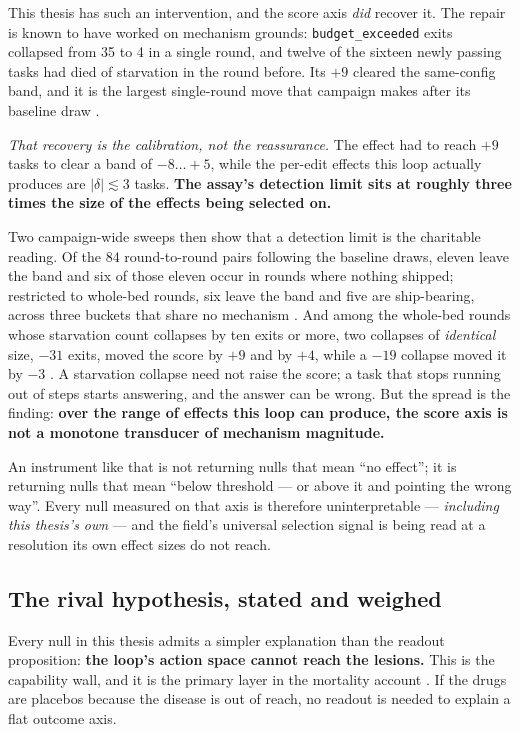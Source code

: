 This thesis has such an intervention, and the score axis \emph{did} recover
it. The repair is known to have worked on mechanism grounds:
\texttt{budget\_exceeded} exits collapsed from 35 to 4 in a single round,
and twelve of the sixteen newly passing tasks had died of starvation in the
round before. Its $+9$ cleared the same-config band, and it is the largest
single-round move that campaign makes after its baseline draw .

\emph{That recovery is the calibration, not the reassurance.} The effect
had to reach $+9$ tasks to clear a band of $-8\ldots{+}5$, while the
per-edit effects this loop actually produces are $|\delta| \lesssim 3$
tasks. \textbf{The assay's detection limit sits at roughly three times the
size of the effects being selected on.}

Two campaign-wide sweeps then show that a detection limit is the charitable
reading. Of the $84$ round-to-round pairs following the baseline draws,
eleven leave the band and six of those eleven occur in rounds where nothing
shipped; restricted to whole-bed rounds, six leave the band and five are
ship-bearing, across three buckets that share no mechanism . And
among the whole-bed rounds whose starvation count collapses by ten exits or
more, two collapses of \emph{identical} size, $-31$ exits, moved the score
by $+9$ and by $+4$, while a $-19$ collapse moved it by $-3$ . A
starvation collapse need not raise the score; a task that stops running out
of steps starts answering, and the answer can be wrong. But the spread is
the finding: \textbf{over the range of effects this loop can produce, the
score axis is not a monotone transducer of mechanism magnitude.}

An instrument like that is not returning nulls that mean ``no effect''; it
is returning nulls that mean ``below threshold --- or above it and pointing
the wrong way''. Every null measured on that axis is therefore
uninterpretable --- \emph{including this thesis's own} --- and the field's
universal selection signal is being read at a resolution its own effect
sizes do not reach.

\subsection*{The rival hypothesis, stated and weighed}

Every null in this thesis admits a simpler explanation than the readout
proposition: \textbf{the loop's action space cannot reach the lesions.}
This is the capability wall, and it is the primary layer in the mortality
account . If the drugs are placebos because the disease is out of
reach, no readout is needed to explain a flat outcome axis.

